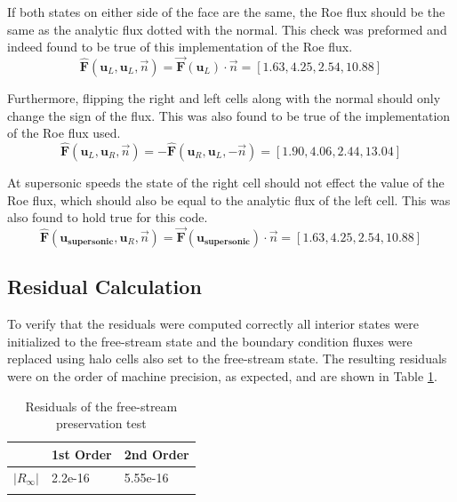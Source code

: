 \documentclass{article}
\begin{document}
If both states on either side of the face are the same, the Roe flux should be the same as the analytic flux dotted with the normal.
This check was preformed and indeed found to be true of this implementation of the Roe flux.
\begin{equation*}
	\mathbf{\hat{F}}(\mathbf{u}_L, \mathbf{u}_L, \vec{n}) = \mathbf{\vec{F}}(\mathbf{u}_L) \cdot \vec{n} = [1.63 , 4.25, 2.54, 10.88]
\end{equation*}

Furthermore, flipping the right and left cells along with the normal should only change the sign of the flux.
This was also found to be true of the implementation of the Roe flux used.
\begin{equation*}
	\mathbf{\hat{F}}(\mathbf{u}_L, \mathbf{u}_R, \vec{n}) = -\mathbf{\hat{F}}(\mathbf{u}_R, \mathbf{u}_L, -\vec{n}) =  [1.90,  4.06,  2.44, 13.04]
\end{equation*}

At supersonic speeds the state of the right cell should not effect the value of the Roe flux, which should also be equal to the analytic flux of the left cell.
This was also found to hold true for this code.
\begin{equation*}
	\mathbf{\hat{F}}(\mathbf{u_\textrm{supersonic}}, \mathbf{u}_R, \vec{n}) = \mathbf{\vec{F}}(\mathbf{u_\textrm{supersonic}}) \cdot \vec{n} = [1.63 , 4.25, 2.54, 10.88]
\end{equation*}

\subsection{Residual Calculation}
To verify that the residuals were computed correctly all interior states were initialized to the free-stream state and the boundary condition fluxes were replaced using halo cells also set to the free-stream state.
The resulting residuals were on the order of machine precision, as expected, and are shown in Table \ref{tab:freestream}.


\begin{table}[H]
	\label{tab:freestream}
	\begin{tabular}{@{}lll@{}}
	\toprule
								& 1st Order & 2nd Order \\ \midrule
	$|R_{\infty}|$ & 2.2e-16  & 5.55e-16  \\ \bottomrule
	\caption{Residuals of the free-stream preservation test}

	\end{tabular}
\end{table}
\end{document}
